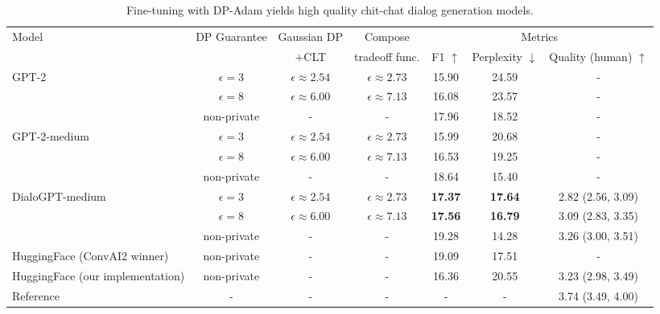 \begin{table}[th]
\footnotesize
\setlength\tabcolsep{2pt}
\caption{
Fine-tuning with DP-Adam yields high quality chit-chat dialog generation models. 
}
\centering
\begin{tabular}{l c c c c c c}
\toprule
\multirow{2}[0]{*}{Model} & \multirow{2}[0]{*}{DP Guarantee} & Gaussian DP & Compose & \multicolumn{3}{c}{Metrics}  \\
 & & +CLT & tradeoff func. & \scriptsize{F1} $\uparrow$  & \scriptsize{Perplexity} $\downarrow$ & \scriptsize{Quality (human)} $\uparrow$ \\
\midrule
\multirow{3}[1]{*}{GPT-2}
& $\epsilon=3$ & $\epsilon \approx 2.54$ & $\epsilon \approx 2.73$ & 15.90 & 24.59  & - \\
& $\epsilon=8$ & $\epsilon \approx 6.00$ & $\epsilon \approx 7.13$ & 16.08 & 23.57  & - \\
& non-private  & - & - & 17.96 & 18.52  & - \\
\midrule
\multirow{3}[1]{*}{GPT-2-medium}
& $\epsilon=3$ & $\epsilon \approx 2.54$ & $\epsilon \approx 2.73$ & 15.99 & 20.68  & - \\
& $\epsilon=8$ & $\epsilon \approx 6.00$ & $\epsilon \approx 7.13$ & 16.53 & 19.25  & - \\
& non-private &- &- & 18.64 & 15.40  & - \\
\midrule
\multirow{3}[1]{*}{DialoGPT-medium}
& $\epsilon=3$ & $\epsilon\approx 2.54$ & $\epsilon \approx 2.73$ & \textbf{17.37} & \textbf{17.64}  & 2.82 (2.56, 3.09)\\
& $\epsilon=8$ & $\epsilon\approx 6.00$ & $\epsilon \approx 7.13$ & \textbf{17.56} & \textbf{16.79}  & 3.09 (2.83, 3.35)\\
& non-private &- &- & 19.28 & 14.28  & 3.26 (3.00, 3.51)\\
\midrule
HuggingFace {\scriptsize (ConvAI2 winner)} & non-private &-	&- & 19.09 & 17.51 & - \\
HuggingFace {\scriptsize (our implementation)} & non-private &- &- & 16.36 & 20.55 & 3.23 (2.98, 3.49) \\
\midrule
Reference &- &- &- &- &- & 3.74 (3.49, 4.00) \\
\bottomrule
\end{tabular}
\label{table:personachat}
\end{table}
